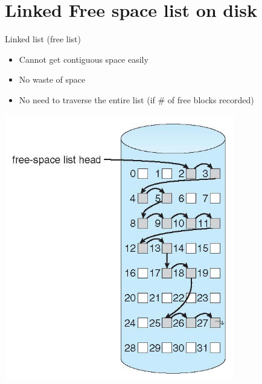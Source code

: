 \documentclass{article}[18pt]
\begin{document}
\section{Linked Free space list on disk}
Linked list (free list)
\begin{itemize}
	\item Cannot get contiguous space easily
	\item No waste of space
	\item No need to traverse the entire list (if \# of free blocks recorded)
\end{itemize}
\begin{center}
	\includegraphics[scale=0.7]{"Linked Free Space"}
\end{center}
\end{document}

